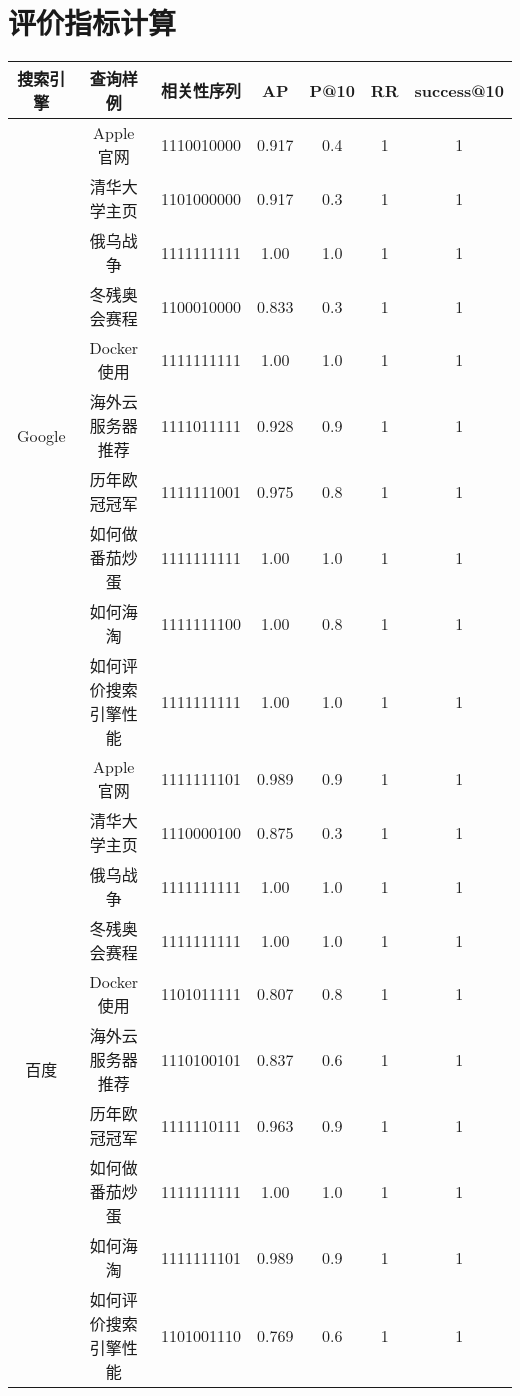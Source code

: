 \documentclass[a4paper]{article}
\begin{document}
\section{评价指标计算}

\begin{center}
  \begin{tabular}{ |c|c|c|c|c|c|c| }
    \hline
    搜索引擎 & 查询样例 & 相关性序列 & AP & P@10 & RR & success@10 \\ \hline
    \multirow{10}{*}{Google}  & Apple 官网 & 1110010000 & 0.917 & 0.4 & 1 & 1 \\ \cline{2-7}
    & 清华大学主页 & 1101000000 & 0.917 & 0.3 & 1 & 1 \\ \cline{2-7}
    & 俄乌战争 & 1111111111 & 1.00 & 1.0 & 1 & 1 \\ \cline{2-7}
    & 冬残奥会赛程 & 1100010000 & 0.833 & 0.3 & 1 & 1 \\ \cline{2-7}
    & Docker 使用 & 1111111111 & 1.00 & 1.0 & 1 & 1 \\ \cline{2-7}
    & 海外云服务器推荐 & 1111011111 & 0.928 & 0.9 & 1 & 1 \\ \cline{2-7}
    & 历年欧冠冠军 & 1111111001 & 0.975 & 0.8 & 1 & 1 \\ \cline{2-7}
    & 如何做番茄炒蛋 & 1111111111 & 1.00 & 1.0 & 1 & 1 \\ \cline{2-7}
    & 如何海淘 & 1111111100 & 1.00 & 0.8 & 1 & 1 \\ \cline{2-7}
    & 如何评价搜索引擎性能 & 1111111111 & 1.00 & 1.0 & 1 & 1 \\ \cline{2-7}

    \hline\hline
    \multirow{10}{*}{百度}  & Apple 官网 & 1111111101 & 0.989 & 0.9 & 1 & 1 \\ \cline{2-7}
    & 清华大学主页 & 1110000100 & 0.875 & 0.3 & 1 & 1 \\ \cline{2-7}
    & 俄乌战争 & 1111111111 & 1.00 & 1.0 & 1 & 1 \\ \cline{2-7}
    & 冬残奥会赛程 & 1111111111 & 1.00 & 1.0 & 1 & 1 \\ \cline{2-7}
    & Docker 使用 & 1101011111 & 0.807 & 0.8 & 1 & 1 \\ \cline{2-7}
    & 海外云服务器推荐 & 1110100101 & 0.837 & 0.6 & 1 & 1 \\ \cline{2-7}
    & 历年欧冠冠军 & 1111110111 & 0.963 & 0.9 & 1 & 1 \\ \cline{2-7}
    & 如何做番茄炒蛋 & 1111111111 & 1.00 & 1.0 & 1 & 1 \\ \cline{2-7}
    & 如何海淘 & 1111111101 & 0.989 & 0.9 & 1 & 1 \\ \cline{2-7}
    & 如何评价搜索引擎性能 & 1101001110 & 0.769 & 0.6 & 1 & 1 \\ \cline{2-7}
    \hline
  \end{tabular}
\end{center}
\end{document}

